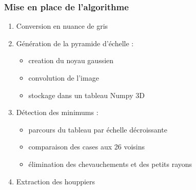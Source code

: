 \documentclass{beamer}
\begin{document}
	\begin{frame}
	\frametitle{Mise en place de l'algorithme}
	\begin{enumerate}
		\item Conversion en nuance de gris
		\item Génération de la pyramide d'échelle : 
		\begin{itemize}
			\item creation du noyau gaussien
			\item convolution de l'image 
			\item stockage dans un tableau Numpy 3D
		\end{itemize}
		\item Détection des minimums : 
		\begin{itemize}
			\item parcours du tableau par échelle décroissante
			\item comparaison des cases aux 26 voisins
			\item élimination des chevauchements et des petits rayons 
		\end{itemize}
		\item Extraction des houppiers
	\end{enumerate}	
\end{frame}
\end{document}
